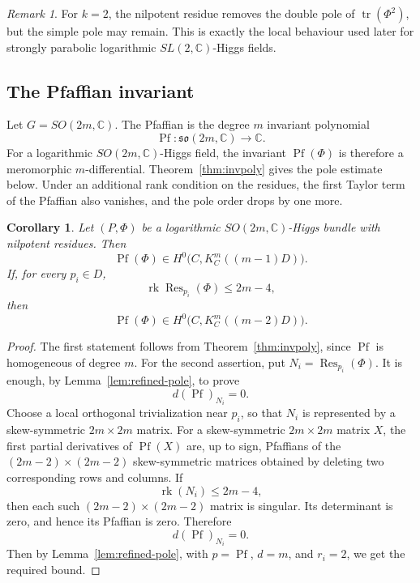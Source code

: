 \documentclass[11pt,reqno]{amsart}
\numberwithin{equation}{section}
\theoremstyle{plain}
\newtheorem{corollary}[theorem]{Corollary}
\theoremstyle{definition}
\theoremstyle{remark}
\newtheorem{remark}[theorem]{Remark}
\begin{document}
\begin{remark}
For \(k=2\), the nilpotent residue removes the double pole of
\(\operatorname{tr}(\Phi^2)\), but the simple pole may remain.  This is exactly
the local behaviour used later for strongly parabolic logarithmic
\(SL(2,\mathbb C)\)-Higgs fields.
\end{remark}

\subsection{The Pfaffian invariant}

Let
\(
        G=SO(2m,\mathbb C).
\)
The Pfaffian is the degree \(m\) invariant polynomial
\[
        \operatorname{Pf}:\mathfrak{so}(2m,\mathbb C)\longrightarrow\mathbb C.
\]
For a logarithmic \(SO(2m,\mathbb C)\)-Higgs field, the invariant
\(
        \operatorname{Pf}(\Phi)
\)
is therefore a meromorphic \(m\)-differential.  Theorem~\ref{thm:invpoly}
gives the pole estimate below. Under an additional rank condition on the
residues, the first Taylor term of the Pfaffian also vanishes, and the pole
order drops by one more.

\begin{corollary}
\label{cor:pfaffian-log}
Let \((P,\Phi)\) be a logarithmic \(SO(2m,\mathbb C)\)-Higgs bundle with
nilpotent residues. Then
\[
        \operatorname{Pf}(\Phi)
        \in
        H^0\bigl(C,K_C^m((m-1)D)\bigr).
\]
If, for every \(p_i\in D\),
\[
        \operatorname{rk}\operatorname{Res}_{p_i}(\Phi)\leq 2m-4,
\]
then
\[
        \operatorname{Pf}(\Phi)
        \in
        H^0\bigl(C,K_C^m((m-2)D)\bigr).
\]
\end{corollary}

\begin{proof}
The first statement follows from Theorem~\ref{thm:invpoly}, since
\(\operatorname{Pf}\) is homogeneous of degree \(m\). For the second assertion, put
\(
        N_i=\operatorname{Res}_{p_i}(\Phi).
\)
It is enough, by Lemma~\ref{lem:refined-pole}, to prove
\[
        d(\operatorname{Pf})_{N_i}=0.
\]
Choose a local orthogonal trivialization near \(p_i\), so that
\(N_i\) is represented by a skew-symmetric \(2m\times 2m\) matrix. For a skew-symmetric \(2m\times 2m\) matrix \(X\), the first partial
derivatives of \(\operatorname{Pf}(X)\) are, up to sign, Pfaffians of the
\((2m-2)\times(2m-2)\) skew-symmetric matrices obtained by deleting two
corresponding rows and columns. If
\[
        \operatorname{rk}(N_i)\leq 2m-4,
\]
then each such \((2m-2)\times(2m-2)\) matrix is singular. Its determinant is
zero, and hence its Pfaffian is zero. Therefore
\[
        d(\operatorname{Pf})_{N_i}=0.
\]
Then by Lemma~\ref{lem:refined-pole}, with \(p=\operatorname{Pf}\), \(d=m\), and
\(r_i=2\), we get the required bound.
\end{proof}
\end{document}

